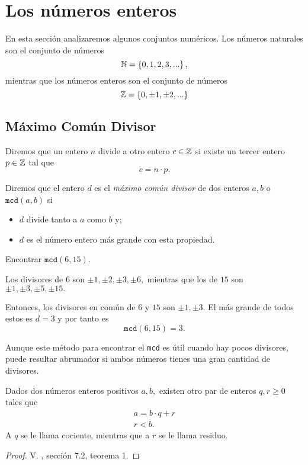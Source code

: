 \section{Los números enteros}
	
	En esta sección analizaremos algunos conjuntos numéricos. 
	Los números naturales son el conjunto de números
	$$
	\mathbb{N}=\left\{ 0,1,2,3,... \right\},
	$$	
	mientras que los números enteros son el conjunto de números
	$$
	\mathbb{Z}=\left\{ 0, \pm1, \pm2,... \right\}	$$	


\subsection{Máximo Común Divisor}
	
\begin{defn}
	Diremos que un entero $n$ divide a otro entero $c\in \mathbb{Z}$ si existe un tercer entero $p\in \mathbb{Z}$ tal que 
	$$c=n\cdot p.$$
\end{defn}

\begin{defn}
	\label{mcd} 
	Diremos que el entero $d$ es el \emph{máximo común divisor} de dos enteros $a,b$ o $\texttt{mcd}(a,b)$  si
	\begin{itemize}
		\item $d$ divide tanto a $a$ como $b$ y;
		\item $d$ es el número entero más grande con esta propiedad.
	\end{itemize}
\end{defn}

	\begin{problema}
		\label{exmp:mcd}
		Encontrar $\texttt{mcd}(6,15).$
	\end{problema}
		
	\begin{sol}
		Los divisores de $6$ son $\pm1, \pm2, \pm3, \pm6,$ mientras que los de $15$ son $\pm1, \pm3, \pm5, \pm15.$
		 		
		Entonces, los divisores en común de $6$ y $15$ son $\pm1,\pm3.$ El más grande de todos estos es 
		$d=3$ y por tanto es $$ \texttt{mcd}(6,15)=3. $$
	\end{sol}
	
 	Aunque este m\'etodo para encontrar el \texttt{mcd} es útil cuando hay pocos divisores, puede resultar abrumador si  	ambos números tienes una gran cantidad de divisores. 
   
	\begin{prop}
		Dados dos números enteros positivos $a,b,$ existen otro par de enteros $q, r\geq 0$ tales que
		\begin{align}
			\label{cociente}
			a=b\cdot q+r\\
			\label{residuo}
			r<b.
		\end{align}
		A $q$ se le llama cociente, mientras que a $r$ se le llama residuo.
	\end{prop}
	\begin{proof}
		V. \cite{cardenas1973algebra}, sección 7.2, teorema 1.
	\end{proof}

